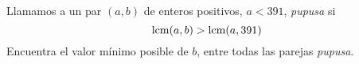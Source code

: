 Llamamos a un par $(a,b)$ de enteros positivos, $a<391$, \textit{pupusa} si
\[\textup{lcm}(a,b)>\textup{lcm}(a,391) \]
Encuentra el valor mínimo posible de $b$, entre todas las parejas \textit{pupusa}.
